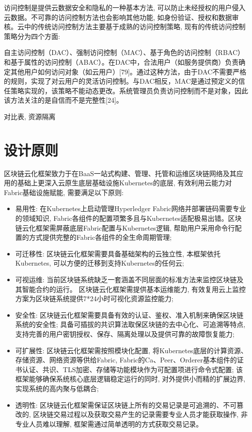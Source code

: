 访问控制是提供云数据安全和隐私的一种基本方法, 可以防止未经授权的用户侵入云数据。不可靠的访问控制方法也会影响其他功能, 如身份验证、授权和数据审核。云中的传统访问控制方法主要基于成熟的访问控制策略, 现有的传统访问控制策略分为四个方面: 

自主访问控制（DAC）、强制访问控制（MAC）、基于角色的访问控制（RBAC）和基于属性的访问控制（ABAC）。在DAC中，合法用户（如服务提供商）负责确定其他用户如何访问对象（如云用户）[79]。通过这种方法，由于DAC不需要严格的规则，实现了对云用户的灵活访问控制。与DAC相反，MAC是通过预定义的信任策略实现的，该策略不能动态更改。系统管理员负责访问控制而不是对象，因此该方法关注的是自信而不是完整性[24]。

对比表, 资源隔离


\section{设计原则}\label{section: framework_characteristics}

区块链云化框架致力于在BaaS一站式构建、管理、托管和运维区块链网络及其应用的基础上更深入云原生底层基础设施Kubernetes的底层, 有效利用云能力对Fabric基础设施赋能, 需要满足以下原则:

\begin{itemize}[itemindent=2em]
    \item 易用性: 在Kubernetes上启动管理Hyperledger Fabric网络并部署链码需要专业的领域知识, Fabric各组件的配置项繁多且与Kubernetes适配极易出错。区块链云化框架需屏蔽底层Fabric配置与Kubernetes逻辑, 帮助用户采用命令行配置的方式提供完整的Fabric各组件的全生命周期管理;

    \item 可迁移性: 区块链云化框架需要具备基础架构的云独立性, 本框架依托Kubernetes, 可以方便的迁移到支持Kubernetes的任何云;

    \item 可视运维: 当前区块链系统缺乏一套涵盖不同层面的标准方法来监控区块链及其智能合约的运行\cite{zhangfuli2021smartcontract}。 区块链云化框架需提供基本运维能力, 有效复用云上监控方案为区块链系统提供7*24小时可视化资源监控能力;

    \item 安全性: 区块链云化框架需要具备有效的认证、鉴权、准入机制来确保区块链系统的安全性; 具备可插拔的共识算法取保区块链的去中心化、可追溯等特点, 支持完善的用户密钥授权、保存、隔离处理以及提供可靠的故障恢复能力;

    \item 可扩展性: 区块链云化框架需按照模块化配置, 将Kubernetes底层的计算资源、存储资源、网络资源等供给Fabric, Fabric的Ca、Peer、Orderer基本组件的证书认证、共识、TLS加密、存储等功能模块作为可配置项进行命令式配置; 该框架能够确保系统核心底层逻辑稳定运行的同时, 对外提供小而精的扩展边界, 实现系统的高内聚与低耦合;

    \item 透明性: 区块链云化框架需保证区块链上所有的交易记录是可追溯的、不可篡改的, 区块链交易过程以及获取交易产生的记录需要专业人员才能获取操作, 非专业人员难以理解, 框架需通过简单透明的方式获取交易记录。
\end{itemize}

